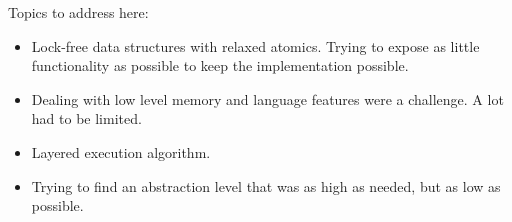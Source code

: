 Topics to address here:
\begin{itemize}
    \item
    Lock-free data structures with relaxed atomics. Trying to expose as little functionality as possible to keep the implementation possible.

    \item
    Dealing with low level memory and language features were a challenge. A lot had to be limited.

    \item
    Layered execution algorithm.

    \item
    Trying to find an abstraction level that was as high as needed, but as low as possible.
\end{itemize}

